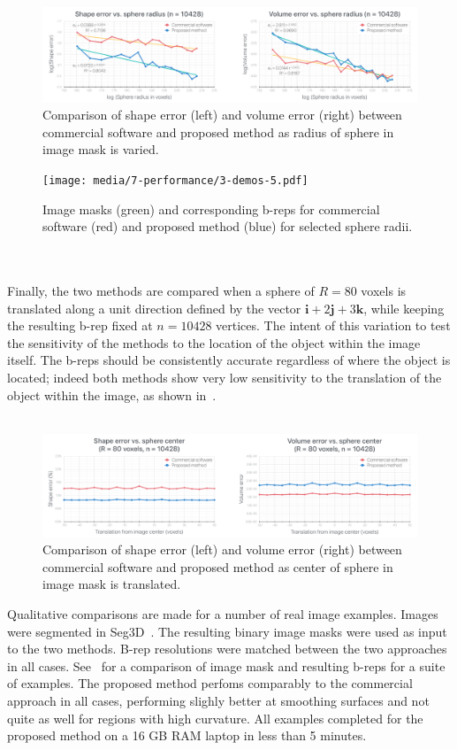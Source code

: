 \begin{figure}[ht!]
	\centering
	\includegraphics[scale=0.25]{media/7-performance/1-graph-2.pdf}
	\caption{Comparison of shape error (left) and volume error (right) between commercial software and proposed method as radius of sphere in image mask is varied.}
	\label{fig:graph2}
\end{figure}
\begin{figure}[ht!]
	\centering
	\texttt{[image: media/7-performance/3-demos-5.pdf]}
	\caption{Image masks (green) and corresponding b-reps for commercial software (red) and proposed method (blue) for selected sphere radii.}
	\label{fig:demos2}
\end{figure} \\ \\ 
%
Finally, the two methods are compared when a sphere of $R = 80$ voxels is translated along a unit direction defined by the vector $\bm{i}  + 2\bm{j} + 3\bm{k}$, while keeping the resulting b-rep fixed at $n = 10428$ vertices. The intent of this variation to test the sensitivity of the methods to the location of the object within the image itself. The b-reps should be consistently accurate regardless of where the object is located; indeed both methods show very low sensitivity to the translation of the object within the image, as shown in~. \\ \\
\begin{figure}[ht!]
	\centering
	\includegraphics[scale=0.25]{media/7-performance/2-graph-3.pdf}
	\caption{Comparison of shape error (left) and volume error (right) between commercial software and proposed method as center of sphere in image mask is translated.}
	\label{fig:graph3}
\end{figure}
%
Qualitative comparisons are made for a number of real image examples. Images were segmented in Seg3D~\cite{Seg3D}. The resulting binary image masks were used as input to the two methods. B-rep resolutions were matched between the two approaches in all cases. See~ for a comparison of image mask and resulting b-reps for a suite of examples. The proposed method perfoms comparably to the commercial approach in all cases, performing slighly better at smoothing surfaces and not quite as well for regions with high curvature. All examples completed for the proposed method on a 16 GB RAM laptop in less than 5 minutes.

